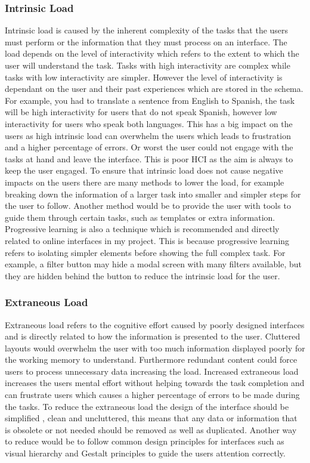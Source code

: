 \documentclass[]{project_final}
\begin{document}
\subsubsection{Intrinsic Load}
Intrinsic load is caused by the inherent complexity of the tasks that the users must perform
or the information that they must process on an interface. The load depends on the level
of interactivity which refers to the extent to which the user will understand the task. Tasks
with high interactivity are complex while tasks with low interactivity are simpler. However
the level of interactivity is dependant on the user and their past experiences which are stored
in the schema. For example, you had to translate a sentence from English to Spanish, the
task will be high interactivity for users that do not speak Spanish, however low interactivity
for users who speak both languages.
This has a big impact on the users as high intrinsic load can overwhelm the users which leads
to frustration and a higher percentage of errors. Or worst the user could not engage with the
tasks at hand and leave the interface. This is poor HCI as the aim is always to keep the user
engaged.
To ensure that intrinsic load does not cause negative impacts on the users there are many
methods to lower the load, for example breaking down the information of a larger task into
smaller and simpler steps for the user to follow. Another method would be to provide the
user with tools to guide them through certain tasks, such as templates or extra information.
Progressive learning is also a technique which is recommended and directly related to online
interfaces in my project. This is because progressive learning refers to isolating simpler
elements before showing the full complex task. For example, a filter button may hide a
modal screen with many filters available, but they are hidden behind the button to reduce
the intrinsic load for the user.
\subsubsection{Extraneous Load}
Extraneous load refers to the cognitive effort caused by poorly designed interfaces and is
directly related to how the information is presented to the user. Cluttered layouts would
overwhelm the user with too much information displayed poorly for the working memory to
understand. Furthermore redundant content could force users to process unnecessary data
increasing the load.
Increased extraneous load increases the users mental effort without helping towards the task
completion and can frustrate users which causes a higher percentage of errors to be made
during the tasks.
To reduce the extraneous load the design of the interface should be simplified , clean and
uncluttered, this means that any data or information that is obsolete or not needed should
be removed as well as duplicated. Another way to reduce would be to follow common design
principles for interfaces such as visual hierarchy and Gestalt principles to guide the users
attention correctly.
\end{document}
